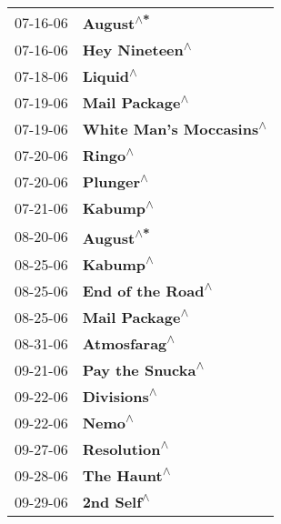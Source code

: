 \begin{supertabular}{p{0.25\columnwidth}p{0.75\columnwidth}}
 07-16-06 &                                         \textbf{August\textsuperscript{$\wedge$*}} \\
 07-16-06 &                                    \textbf{Hey Nineteen\textsuperscript{$\wedge$}} \\
 07-18-06 &                                          \textbf{Liquid\textsuperscript{$\wedge$}} \\
 07-19-06 &                                    \textbf{Mail Package\textsuperscript{$\wedge$}} \\
 07-19-06 &                           \textbf{White Man's Moccasins\textsuperscript{$\wedge$}} \\
 07-20-06 &                                           \textbf{Ringo\textsuperscript{$\wedge$}} \\
 07-20-06 &                                         \textbf{Plunger\textsuperscript{$\wedge$}} \\
 07-21-06 &                                          \textbf{Kabump\textsuperscript{$\wedge$}} \\
 08-20-06 &                                         \textbf{August\textsuperscript{$\wedge$*}} \\
 08-25-06 &                                          \textbf{Kabump\textsuperscript{$\wedge$}} \\
 08-25-06 &                                 \textbf{End of the Road\textsuperscript{$\wedge$}} \\
 08-25-06 &                                    \textbf{Mail Package\textsuperscript{$\wedge$}} \\
 08-31-06 &                                      \textbf{Atmosfarag\textsuperscript{$\wedge$}} \\
 09-21-06 &                                  \textbf{Pay the Snucka\textsuperscript{$\wedge$}} \\
 09-22-06 &                                       \textbf{Divisions\textsuperscript{$\wedge$}} \\
 09-22-06 &                                            \textbf{Nemo\textsuperscript{$\wedge$}} \\
 09-27-06 &                                      \textbf{Resolution\textsuperscript{$\wedge$}} \\
 09-28-06 &                                       \textbf{The Haunt\textsuperscript{$\wedge$}} \\
 09-29-06 &                                        \textbf{2nd Self\textsuperscript{$\wedge$}} \\

\end{supertabular}
